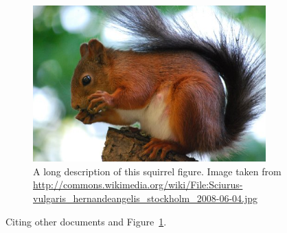 \begin{figure}[tbp]
  \centering
  \includegraphics[width=0.8\textwidth]{images/squirrel}
  \caption[Short description]{A long description of this squirrel figure.
  Image taken from
  \url{http://commons.wikimedia.org/wiki/File:Sciurus-vulgaris_hernandeangelis_stockholm_2008-06-04.jpg}}
  \label{fig:squirrel}
\end{figure}

Citing \cite{bellard2005qfa} other documents \cite{bellard2005qfa, boileau06}
and Figure~\ref{fig:squirrel}.

\cleardoublepage

